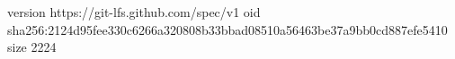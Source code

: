 version https://git-lfs.github.com/spec/v1
oid sha256:2124d95fee330c6266a320808b33bbad08510a56463be37a9bb0cd887efe5410
size 2224
